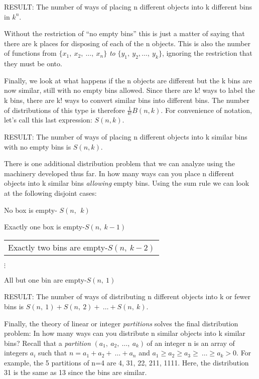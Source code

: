 \documentclass[10pt,letter]{article}
\renewenvironment{quote}
  {\begin{tabular}{|p{13cm}}}
  {\end{tabular}}
\begin{document}
RESULT: The number of ways of placing n different objects into k
different bins in \(k^{n}.\)

Without the restriction of ``no empty bins'' this is just a matter of
saying that there are k places for disposing of each of the n objects.
This is also the number of functions from
\(\{ x_{1},\ x_{2},\ \ldots,\ x_{n}\}\) \emph{to} 
\(\{ y_{1},\ y_{2},\ldots,\ y_{k}\}\), ignoring the restriction that
they must be onto.

Finally, we look at what happens if the n objects are different but the
k bins are now similar, still with no empty bins allowed. Since there
are k! ways to label the k bins, there are k! ways to convert similar
bins into different bins. The number of distributions of this type is
therefore \(\frac{1}{k!}B(n,k)\). For convenience of notation, let's
call this last expression: \(S\left( n,k \right).\)

RESULT: The number of ways of placing n different objects into k similar
bins with no empty bins is \(S\left( n,k \right).\)

There is one additional distribution problem that we can analyze using
the machinery developed thus far. In how many ways can you place n
different objects into k similar bins \emph{allowing} empty bins. Using
the sum rule we can look at the following disjoint cases:

No box is empty- \(S(n,\ \ k)\)

Exactly one box is empty-\(S(n,\ k - 1)\)

\begin{quote}
Exactly two bins are empty-\(S(n,\ k - 2)\)

\end{quote}

\(\vdots\)

All but one bin are empty-\(S(n,\ 1)\)

RESULT: The number of ways of distributing n different objects into k or
fewer bins is
\(S\left( n,\ 1 \right) + S\left( n,\ 2 \right) + \ \ldots + S(n,\ k)\).

Finally, the theory of linear or integer \emph{partitions} solves the
final distribution problem: In how many ways can you distribute n
similar objects into k similar bins? Recall that a \emph{partition} 
\(\left( a_{1},\ a_{2},\ \ldots,\ a_{k} \right)\ \)of an integer n is an
array of integers \(a_{i}\) such that
\(n = a_{1} + a_{2} + \ \ldots + a_{n}\) and
\(a_{1} \geq a_{2} \geq a_{3} \geq \ \ldots \geq a_{k} > 0\). For
example, the 5 partitions of n=4 are 4, 31, 22, 211, 1111. Here, the
distribution 31 is the same as 13 since the bins are similar.
\end{document}

